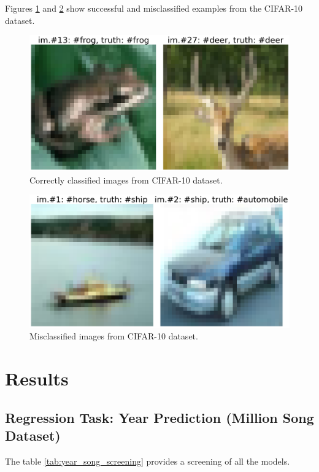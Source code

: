\documentclass[twocolumn]{article}
\begin{document}
Figures \ref{fig:success_classification} and \ref{fig:miss_classification} show 
successful and misclassified examples from the CIFAR-10 dataset.

\begin{figure}[h]
    \centering
    \includegraphics[width=0.95\linewidth]{images/CIFAR/scucess.png}
    \caption{Correctly classified images from CIFAR-10 dataset.}
    \label{fig:success_classification}
\end{figure}

\begin{figure}[h]
    \centering
    \includegraphics[width=0.95\linewidth]{images/CIFAR/missclasiffied.png}
    \caption{Misclassified images from CIFAR-10 dataset.}
    \label{fig:miss_classification}
\end{figure}

\section{Results}

\subsection{Regression Task: Year Prediction (Million Song Dataset)}
The table \ref{tab:year_song_screening} provides a screening of all the models.
\end{document}
